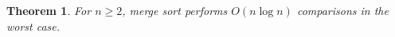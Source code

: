 \documentclass{article}
\newtheorem{theorem}{Theorem}
\begin{document}
\begin{theorem}\label{thm:G06}
For $n\ge2$, merge sort performs $O(n\log n)$ comparisons in the worst case.
\end{theorem}
\end{document}

